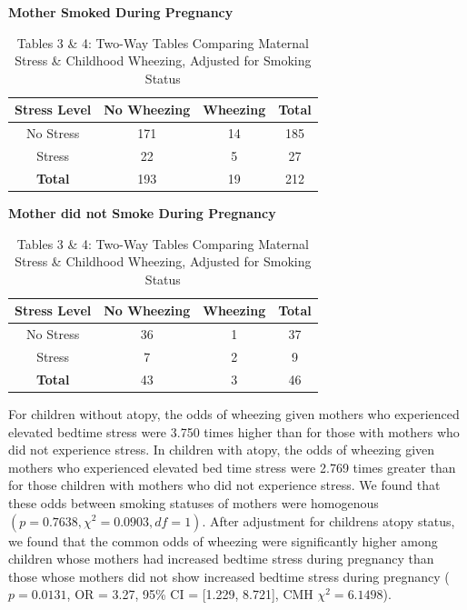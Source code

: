 \documentclass{article}
\begin{document}
	\begin{table}[h]
		\centering
		\captionsetup{labelformat=empty}
		\footnotesize
		\caption{Tables 3 \& 4: Two-Way Tables Comparing Maternal Stress \& Childhood Wheezing, Adjusted for Smoking Status}
		\begin{minipage}{0.48\linewidth}
			\centering
			\textbf{Mother Smoked During Pregnancy} \\[2pt]
			\begin{tabular}{cccc} %
				\toprule
				\textbf{Stress Level} & \textbf{No Wheezing} & \textbf{Wheezing} & \textbf{Total} \\
				\midrule
				No Stress & 171 & 14 & 185 \\
				Stress & 22 & 5 & 27 \\
				\midrule
				\textbf{Total} & 193 & 19 & 212 \\
				\bottomrule
			\end{tabular}
		\end{minipage}
		\hfill
		\begin{minipage}{0.48\linewidth}
			\centering
			\textbf{Mother did not Smoke During Pregnancy} \\[2pt]
			\begin{tabular}{cccc} %
				\toprule
				\textbf{Stress Level} & \textbf{No Wheezing} & \textbf{Wheezing} & \textbf{Total} \\
				\midrule
				No Stress & 36 & 1 & 37 \\
				Stress & 7 & 2 & 9 \\
				\midrule
				\textbf{Total} & 43 & 3 & 46 \\
				\bottomrule
			\end{tabular}
		\end{minipage}
	\end{table}

	For children without atopy, the odds of wheezing given mothers who experienced elevated bedtime stress were 3.750 times higher than for those with mothers who did not experience stress. In children with atopy, the odds of wheezing given mothers who experienced elevated bed time stress were  2.769 times greater than for those children with mothers who did not experience stress. We found that these odds between smoking statuses of mothers were homogenous $(p = 0.7638, \chi^2 = 0.0903, df = 1)$.  After adjustment for childrens atopy status, we found that the common odds of wheezing were significantly higher among children whose mothers had increased bedtime stress during pregnancy than those whose mothers did not show increased bedtime stress during pregnancy ($p=0.0131$, OR = 3.27, 95\% CI = [1.229, 8.721], CMH $\chi^2 = 6.1498$).
\end{document}
